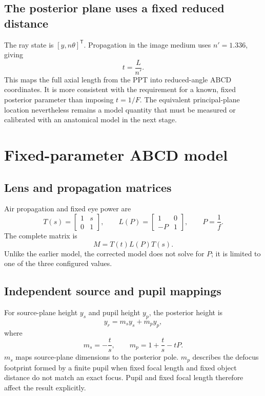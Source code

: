 \documentclass[11pt,openany]{report}
\begin{document}
\section{The posterior plane uses a fixed reduced distance}
The ray state is $[y,n\theta]^\mathsf{T}$. Propagation in the image medium uses $n'=1.336$, giving
\[
t=\frac{L}{n'}.
\]
This maps the full axial length from the PPT into reduced-angle ABCD coordinates. It is more consistent with the requirement for a known, fixed posterior parameter than imposing $t=1/F$. The equivalent principal-plane location nevertheless remains a model quantity that must be measured or calibrated with an anatomical model in the next stage.

\chapter{Fixed-parameter ABCD model}

\section{Lens and propagation matrices}
Air propagation and fixed eye power are
\[
T(s)=\begin{bmatrix}1&s\\0&1\end{bmatrix},\qquad
L(P)=\begin{bmatrix}1&0\\-P&1\end{bmatrix},\qquad P=\frac{1}{f}.
\]
The complete matrix is
\[
M=T(t)L(P)T(s).
\]
Unlike the earlier model, the corrected model does not solve for $P$; it is limited to one of the three configured values.

\section{Independent source and pupil mappings}
For source-plane height $y_s$ and pupil height $y_p$, the posterior height is
\[
y_r=m_s y_s+m_p y_p,
\]
where
\[
m_s=-\frac{t}{s},\qquad m_p=1+\frac{t}{s}-tP.
\]
$m_s$ maps source-plane dimensions to the posterior pole. $m_p$ describes the defocus footprint formed by a finite pupil when fixed focal length and fixed object distance do not match an exact focus. Pupil and fixed focal length therefore affect the result explicitly.
\end{document}
